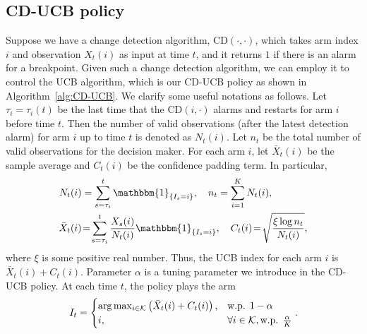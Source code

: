 \documentclass[letterpaper]{article} %
\newcommand{\magenta}{}
\begin{document}
\subsection{CD-UCB policy}
Suppose we have a change detection algorithm, CD$(\cdot,\cdot)$, which takes arm index $i$ and observation $X_t(i)$ as input at time $t$, and it returns $1$ if there is an alarm for a breakpoint. Given such a change detection algorithm, we can employ it to control the UCB algorithm, which is our CD-UCB policy as shown in Algorithm~\ref{alg:CD-UCB}. We clarify some useful notations as follows.
{\magenta Let $\tau_i = \tau_i(t)$ be the last time that the CD$(i,\cdot)$ alarms and restarts for arm $i$ before time $t$.}
Then the number of valid observations (after the latest detection alarm) for arm $i$ up to time $t$ is denoted as $N_t(i)$. Let $n_t$ be the total number of valid observations for the decision maker. For each arm $i$, let $\bar{X}_t(i)$ be the sample average and $C_t(i)$ be the confidence padding term. In particular,
\begin{align}\label{eqn:update}
N_t(i)&=\sum_{s=\tau_i}^t\mathbbm{1}_{\{I_s=i\}},~~~n_t=\sum_{i=1}^K N_t(i),\\
\bar{X}_t(i) &\!=\! \sum_{s=\tau_i}^t\frac{X_s(i)}{N_t(i)}\mathbbm{1}_{\{I_s=i\}},~~~C_t(i) \!=\!  \sqrt{\frac{\xi\log{n_t}}{N_t(i)}},
\end{align}
where $\xi$ is some positive real number.
Thus, the UCB index for each arm $i$ is $\bar{X}_t(i)+C_t(i)$. Parameter $\alpha$ is a tuning parameter we introduce in the CD-UCB policy. At each time $t$, the policy plays the arm %
\begin{eqnarray}\label{eqn:It}
I_t=
\begin{cases}
\arg\max_{i\in\mathcal{K}}\left(\bar{X}_t(i)+C_t(i)\right),  &\text{w.p. } 1-\alpha\cr
i, & \forall i \in \mathcal{K}, \text{w.p. } \frac{\alpha}{K}
\end{cases}.
\end{eqnarray}
\end{document}
